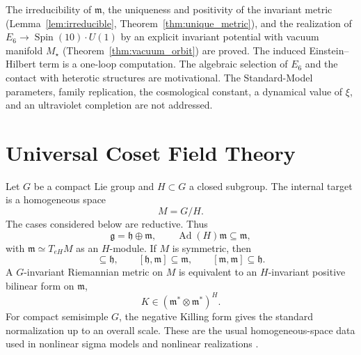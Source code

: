 \documentclass[aps,prd,preprint,longbibliography,nofootinbib,superscriptaddress,floatfix]{revtex4-2}
\newcommand{\Spin}{\operatorname{Spin}}
\newcommand{\Ad}{\operatorname{Ad}}
\begin{document}
The irreducibility of \(\mathfrak m\), the uniqueness and positivity of the
invariant metric (Lemma~\ref{lem:irreducible}, Theorem~\ref{thm:unique_metric}),
and the realization of \(E_6\to\Spin(10)\cdot U(1)\) by an explicit invariant
potential with vacuum manifold \(M_\star\) (Theorem~\ref{thm:vacuum_orbit}) are
proved. The induced Einstein--Hilbert term is a one-loop computation. The
algebraic selection of \(E_6\) and the contact with heterotic structures are
motivational. The Standard-Model parameters, family replication, the
cosmological constant, a dynamical value of \(\xi\), and an ultraviolet
completion are not addressed.


\section{Universal Coset Field Theory}
\label{sec:ucft}

Let \(G\) be a compact Lie group and \(H\subset G\) a closed subgroup. The
internal target is a homogeneous space
\begin{equation}
    M=G/H .
    \label{eq:ucft_target}
\end{equation}
The cases considered below are reductive. Thus
\begin{equation}
    \mathfrak g
    =
    \mathfrak h\oplus\mathfrak m,
    \qquad
    \Ad(H)\mathfrak m\subseteq\mathfrak m ,
    \label{eq:ucft_reductive_decomposition}
\end{equation}
with \(\mathfrak m\simeq T_{eH}M\) as an \(H\)-module. If \(M\) is symmetric,
then
\begin{equation}
    [\mathfrak h,\mathfrak h]\subseteq\mathfrak h,
    \qquad
    [\mathfrak h,\mathfrak m]\subseteq\mathfrak m,
    \qquad
    [\mathfrak m,\mathfrak m]\subseteq\mathfrak h .
    \label{eq:ucft_symmetric_brackets}
\end{equation}
A \(G\)-invariant Riemannian metric on \(M\) is equivalent to an
\(H\)-invariant positive bilinear form on \(\mathfrak m\),
\begin{equation}
    K\in(\mathfrak m^\ast\otimes\mathfrak m^\ast)^H .
    \label{eq:ucft_invariant_metric}
\end{equation}
For compact semisimple \(G\), the negative Killing form gives the standard
normalization up to an overall scale. These are the usual homogeneous-space
data used in nonlinear sigma models and nonlinear realizations
\cite{Helgason,ColemanWessZumino,CallanColemanWessZumino,WeinbergQFT2}.
\end{document}
